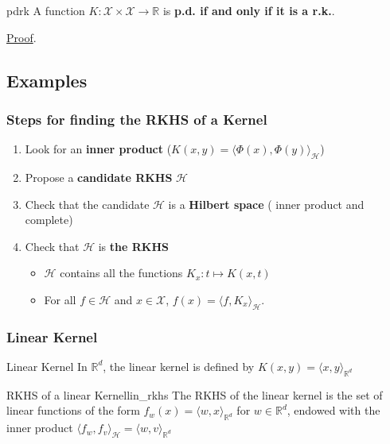 \documentclass{article}
\begin{document}
\begin{Theorem}{}{pdrk}
  A function $K : \mathcal{X} \times \mathcal{X} \rightarrow \mathbb{R}$ is 
  \textbf{p.d. if and only if it is a r.k.}.
  \par \hfill \hyperref[prf:pdrk]{\small Proof}.
\end{Theorem}



\subsection{Examples}

\subsubsection{Steps for finding the RKHS of a Kernel}
\begin{enumerate}
  \item Look for an \textbf{inner product} ($K(x, y) = \langle \Phi(x), \Phi(y)
  \rangle_\mathcal{H}$)
  \item Propose a \textbf{candidate RKHS} $\mathcal{H}$
  \item Check that the candidate $\mathcal{H}$ is a \textbf{Hilbert space} (
  inner product and complete)
  \item Check that $\mathcal{H}$ is \textbf{the RKHS}
  \begin{itemize}
    \item $\mathcal{H}$ contains all the functions $K_x : t \mapsto K(x,t)$
    \item For all $f \in \mathcal{H}$ and $x\in \mathcal{X}$, $f(x) = \langle
    f, K_x \rangle_\mathcal{H}$.
  \end{itemize}
\end{enumerate}

\subsubsection{Linear Kernel}

\begin{Definition}{Linear Kernel}{}
  In $\mathbb{R}^d$, the linear kernel is defined by $K(x, y) = \langle x, y 
  \rangle_{\mathbb{R}^d}$
\end{Definition}

\begin{Theorem}{RKHS of a linear Kernel}{lin_rkhs}
  The RKHS of the linear kernel is the set of linear functions of the form 
  $f_w(x) = \langle w,x \rangle_{\mathbb{R}^d}$ for $w \in \mathbb{R}^d$,
  endowed with the inner product $\langle f_w,f_v \rangle_\mathcal{H} = 
  \langle w,v \rangle_{\mathbb{R}^d}$
\end{Theorem}
\end{document}
